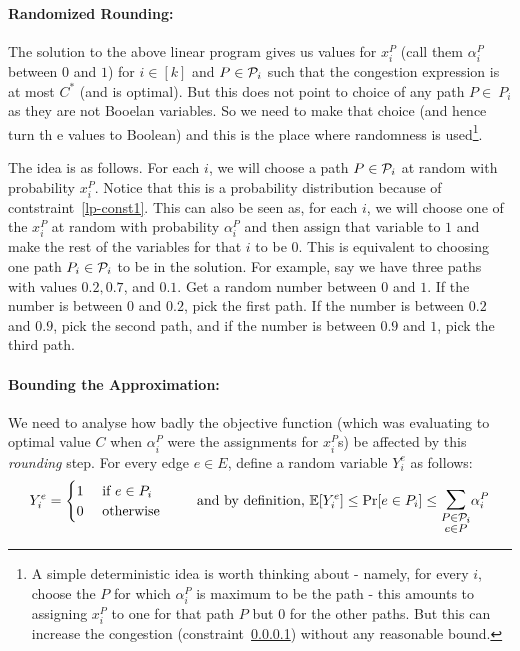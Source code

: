 \paragraph*{Randomized Rounding:} The solution to the above linear program gives us values for $x_i^P$ (call them $\alpha_i^P$ between $0$ and $1$) for $i \in [k]$ and $P \in {\cal P}_i$ such that the congestion expression is at most $C^*$ (and is optimal). But this does not point to choice of any path $P \in \ P_i$ as they are not Booelan variables. So we need to make that choice (and hence turn th e values to Boolean) and this is the place where randomness is used\footnote{A simple deterministic idea is worth thinking about - namely, for every $i$, choose the $P$ for which $\alpha_i^P$ is maximum to be the path - this amounts to assigning $x_i^P$ to one for that path $P$ but $0$ for the other paths. But this can increase the congestion (constraint~\ref{}) without any reasonable bound.}.

The idea is as follows. For each $i$, we will choose a path $P \in {\cal P}_i$ at random with probability $x_i^P$. Notice that this is a probability distribution because of contstraint~\ref{lp-const1}. This can also be seen as, for each $i$, we will choose one of the $x_i^P$ at random with probability $\alpha_i^P$ and then assign that variable to $1$ and make the rest of the variables for that $i$ to be $0$. This is equivalent to choosing one path $P_i \in {\cal P}_i$ to be in the solution. For example, say we have three paths
with values $0.2, 0.7$, and $0.1$. Get a random number between $0$ and $1$. If the number is between $0$
and $0.2$, pick the first path. If the number is between $0.2$ and $0.9$, pick the second path, and if the
number is between $0.9$ and $1$, pick the third path.

\paragraph{Bounding the Approximation:} We need to analyse how badly the objective function (which was evaluating to optimal value $C$ when $\alpha_i^P$ were the assignments for $x_i^P$s) be affected by this {\em rounding} step. 
For every edge $e \in E$, define a random variable $Y_i^e$ as follows:
$$Y_i^e = 
\begin{cases}
1 & \textrm{ if $e \in P_i$ }\\
0 & \textrm{ otherwise }
\end{cases}
\textrm{\hspace{6mm} and by definition, }
\E[Y_i^e] \le \Pr[e \in P_i] \le \bigsum_{\substack{P \in {\cal P}_i \\ e \in P}} \alpha_i^P
$$

